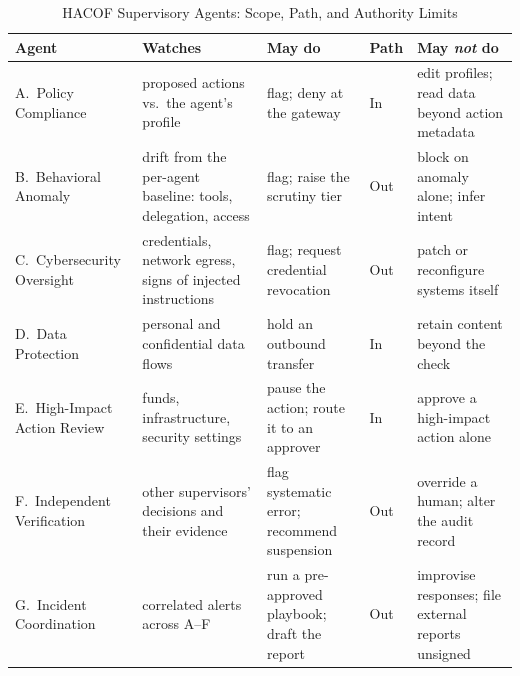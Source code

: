 \documentclass[journal]{IEEEtran}
\newcommand{\hacof}{HACOF}
\begin{document}
\begin{table}[!t]
\caption{\hacof{} Supervisory Agents: Scope, Path, and Authority Limits}
\label{tab:supervisors}
\centering
\footnotesize
\setlength{\tabcolsep}{4pt}
\begin{tabular}{>{\raggedright\arraybackslash}p{2.9cm}>{\raggedright\arraybackslash}p{3.6cm}>{\raggedright\arraybackslash}p{3.6cm}>{\raggedright\arraybackslash}p{1.0cm}>{\raggedright\arraybackslash}p{4.4cm}}
\toprule
\rowcolor{darkblue!15}
\textbf{Agent} & \textbf{Watches} & \textbf{May do} & \textbf{Path} & \textbf{May \emph{not} do} \\
\midrule
A.\ Policy Compliance & proposed actions vs.\ the agent's profile & flag; deny at the gateway & In & edit profiles; read data beyond action metadata \\
\rowcolor{darkblue!5}
B.\ Behavioral Anomaly & drift from the per-agent baseline: tools, delegation, access & flag; raise the scrutiny tier & Out & block on anomaly alone; infer intent \\
C.\ Cybersecurity Oversight & credentials, network egress, signs of injected instructions & flag; request credential revocation & Out & patch or reconfigure systems itself \\
\rowcolor{darkblue!5}
D.\ Data Protection & personal and confidential data flows & hold an outbound transfer & In & retain content beyond the check \\
E.\ High-Impact Action Review & funds, infrastructure, security settings & pause the action; route it to an approver & In & approve a high-impact action alone \\
\rowcolor{darkblue!5}
F.\ Independent Verification & other supervisors' decisions and their evidence & flag systematic error; recommend suspension & Out & override a human; alter the audit record \\
G.\ Incident Coordination & correlated alerts across A--F & run a pre-approved playbook; draft the report & Out & improvise responses; file external reports unsigned \\
\bottomrule
\end{tabular}
\end{table}
\end{document}
